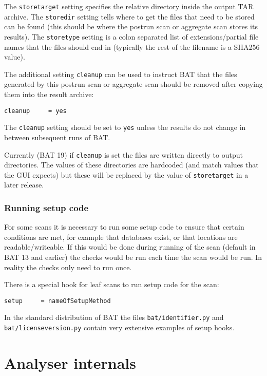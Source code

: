 \documentclass[10pt]{article}
\begin{document}
The \texttt{storetarget} setting specifies the relative directory inside the
output TAR archive. The \texttt{storedir} setting tells where to get the files
that need to be stored can be found (this should be where the postrun scan
or aggregate scan stores its results). The \texttt{storetype} setting is a colon
separated list of extensions/partial file names that the files should end in
(typically the rest of the filename is a SHA256 value).

The additional setting \texttt{cleanup} can be used to instruct BAT that the
files generated by this postrun scan or aggregate scan should be removed after
copying them into the result archive:

\begin{verbatim}
cleanup     = yes
\end{verbatim}

The \texttt{cleanup} setting should be set to \texttt{yes} unless the results
do not change in between subsequent runs of BAT.

Currently (BAT 19) if \texttt{cleanup} is set the files are written directly to
output directories. The values of these directories are hardcoded (and match
values that the GUI expects) but these will be replaced by the value of
\texttt{storetarget} in a later release.

\subsubsection{Running setup code}

For some scans it is necessary to run some setup code to ensure that certain
conditions are met, for example that databases exist, or that locations are
readable/writeable. If this would be done during running of the scan (default
in BAT 13 and earlier) the checks would be run each time the scan would be run.
In reality the checks only need to run once.

There is a special hook for leaf scans to run setup code for the scan:

\begin{verbatim}
setup     = nameOfSetupMethod
\end{verbatim}

In the standard distribution of BAT the files \texttt{bat/identifier.py} and
\texttt{bat/licenseversion.py} contain very extensive examples of setup hooks.

\section{Analyser internals}
\end{document}
